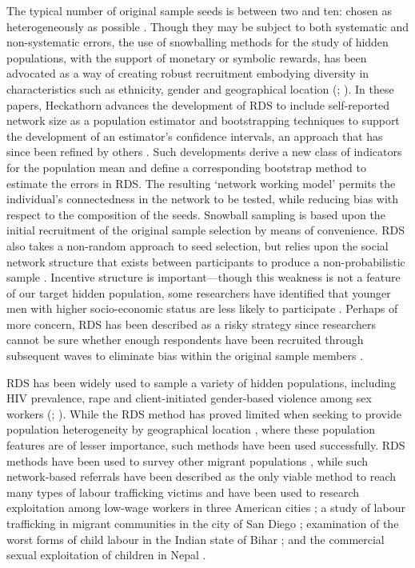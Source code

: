 \documentclass[
  12pt,
  letterpaper,
  DIV=11,
  numbers=noendperiod]{scrartcl}
\theoremstyle{plain}
\theoremstyle{definition}
\begin{document}
The typical number of original sample seeds is between two and ten:
chosen as heterogeneously as possible \autocite{gile_methods_2018}.
Though they may be subject to both systematic and non-systematic errors,
the use of snowballing methods for the study of hidden populations, with
the support of monetary or symbolic rewards, has been advocated as a way
of creating robust recruitment embodying diversity in characteristics
such as ethnicity, gender and geographical location
(\textcite{heckathorn_respondent-driven_1997};
\textcite{heckathorn_respondent-driven_2002}). In these papers,
Heckathorn advances the development of RDS to include self-reported
network size as a population estimator and bootstrapping techniques to
support the development of an estimator's confidence intervals, an
approach that has since been refined by others
\autocite{gile_network_2015}. Such developments derive a new class of
indicators for the population mean and define a corresponding bootstrap
method to estimate the errors in RDS. The resulting `network working
model' permits the individual's connectedness in the network to be
tested, while reducing bias with respect to the composition of the
seeds. Snowball sampling is based upon the initial recruitment of the
original sample selection by means of convenience. RDS also takes a
non-random approach to seed selection, but relies upon the social
network structure that exists between participants to produce a
non-probabilistic sample \autocite{goodman_comment_2011}. Incentive
structure is important---though this weakness is not a feature of our
target hidden population, some researchers have identified that younger
men with higher socio-economic status are less likely to participate
\autocite{mccreesh_respondent_2013}. Perhaps of more concern, RDS has
been described as a risky strategy since researchers cannot be sure
whether enough respondents have been recruited through subsequent waves
to eliminate bias within the original sample members
\autocite{vincent_estimating_2017}.

RDS has been widely used to sample a variety of hidden populations,
including HIV prevalence, rape and client-initiated gender-based
violence among sex workers (\textcite{mccreesh_evaluation_2012};
\textcite{schwitters_prevalence_2012}). While the RDS method has proved
limited when seeking to provide population heterogeneity by geographical
location \autocite{mccreesh_evaluation_2011}, where these population
features are of lesser importance, such methods have been used
successfully. RDS methods have been used to survey other migrant
populations \autocite{tyldum_surveying_2021}, while such network-based
referrals have been described as the only viable method to reach many
types of labour trafficking victims \autocite{zhang_measuring_2012} and
have been used to research exploitation among low-wage workers in three
American cities \autocite{bernhardt_broken_2009}; a study of labour
trafficking in migrant communities in the city of San Diego
\autocite{vincent_estimating_2017}; examination of the worst forms of
child labour in the Indian state of Bihar \autocite{zhang_victims_2019};
and the commercial sexual exploitation of children in Nepal
\autocite{jordan_overcoming_2020}.
\end{document}

